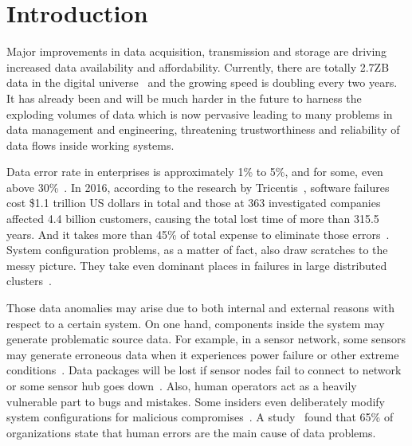 \documentclass[a4paper]{IEEEtran}
\begin{document}
	\section{Introduction}
		Major improvements in data acquisition, transmission and storage are driving increased data availability and affordability. Currently, there are totally 2.7ZB data in the digital universe~\autocite{bigDataStatistics} and the growing speed is doubling every two years.
		It has already been and will be much harder in the future to harness the exploding volumes of data which is now pervasive leading to many problems in data management and engineering, threatening trustworthiness and reliability of data flows inside working systems.
		
		Data error rate in enterprises is approximately 1\% to 5\%, and for some, even above 30\%~\autocite{saha2014data}.
		In 2016, according to the research by Tricentis~\cite{softwareFailure}, software failures cost \$1.1 trillion US dollars in total and those at 363 investigated companies affected 4.4 billion customers, causing the total lost time of more than 315.5 years. And it takes more than 45\% of total expense to eliminate those errors~\cite{pawar2016software}. System configuration problems, as a matter of fact, also draw scratches to the messy picture. They take even dominant places in failures in large distributed clusters~\cite{xu2015systems}.
		
		Those data anomalies may arise due to both internal and external reasons with respect to a certain system. On one hand, components inside the system may generate problematic source data. For example, in a sensor network, some sensors may generate erroneous data when it experiences power failure or other extreme conditions~\autocite{rassam2014adaptive}. Data packages will be lost if sensor nodes fail to connect to network or some sensor hub goes down~\autocite{herodotou2014scalable}. Also, human operators act as a heavily vulnerable part to bugs and mistakes. Some insiders even deliberately modify system configurations for malicious compromises~\autocite{schuster2015vc3}. A study~\autocite{humanError} found that 65\% of organizations state that human errors are the main  cause of data problems.
		
\end{document}

